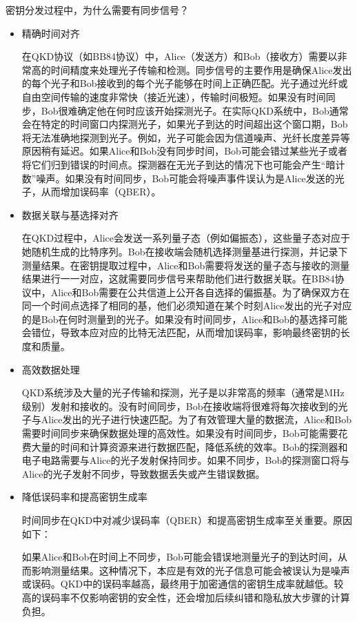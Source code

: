 \begin{question}
	密钥分发过程中，为什么需要有同步信号？
\end{question}
\begin{itemize}
	\item 精确时间对齐
	
	在QKD协议（如BB84协议）中，Alice（发送方）和Bob（接收方）需要以非常高的时间精度来处理光子传输和检测。同步信号的主要作用是确保Alice发出的每个光子和Bob接收到的每个光子能够在时间上正确匹配。光子通过光纤或自由空间传输的速度非常快（接近光速），传输时间极短。如果没有时间同步，Bob很难确定他在何时应该开始探测光子。在实际QKD系统中，Bob通常会在特定的时间窗口内探测光子，如果光子到达的时间超出这个窗口期，Bob将无法准确地探测到光子。例如，光子可能会因为信道噪声、光纤长度差异等原因稍有延迟。如果Alice和Bob没有同步时间，Bob可能会错过某些光子或者将它们归到错误的时间点。探测器在无光子到达的情况下也可能会产生“暗计数”噪声。如果没有时间同步，Bob可能会将噪声事件误认为是Alice发送的光子，从而增加误码率（QBER）。
	
	\item 数据关联与基选择对齐
	
	在QKD过程中，Alice会发送一系列量子态（例如偏振态），这些量子态对应于她随机生成的比特序列。Bob在接收端会随机选择测量基进行探测，并记录下测量结果。在密钥提取过程中，Alice和Bob需要将发送的量子态与接收的测量结果进行一一对应，这就需要同步信号来帮助他们进行数据关联。在BB84协议中，Alice和Bob需要在公共信道上公开各自选择的偏振基。为了确保双方在同一个时间点选择了相同的基，他们必须知道在某个时刻Alice发出的光子对应的是Bob在何时测量到的光子。如果没有时间同步，Alice和Bob的基选择可能会错位，导致本应对应的比特无法匹配，从而增加误码率，影响最终密钥的长度和质量。
	
	\item 高效数据处理
	
	QKD系统涉及大量的光子传输和探测，光子是以非常高的频率（通常是MHz级别）发射和接收的。没有时间同步，Bob在接收端将很难将每次接收到的光子与Alice发出的光子进行快速匹配。为了有效管理大量的数据流，Alice和Bob需要时间同步来确保数据处理的高效性。如果没有时间同步，Bob可能需要花费大量的时间和计算资源来进行数据匹配，降低系统的效率。Bob的探测器和电子电路需要与Alice的光子发射保持同步。如果不同步，Bob的探测窗口将与Alice的光子发射不同步，导致数据丢失或产生错误数据。
	
	\item 降低误码率和提高密钥生成率
	
	时间同步在QKD中对减少误码率（QBER）和提高密钥生成率至关重要。原因如下：
	
	如果Alice和Bob在时间上不同步，Bob可能会错误地测量光子的到达时间，从而影响测量结果。这种情况下，本应是有效的光子信息可能会被误认为是噪声或误码。QKD中的误码率越高，最终用于加密通信的密钥生成率就越低。较高的误码率不仅影响密钥的安全性，还会增加后续纠错和隐私放大步骤的计算负担。
	

\end{itemize}
